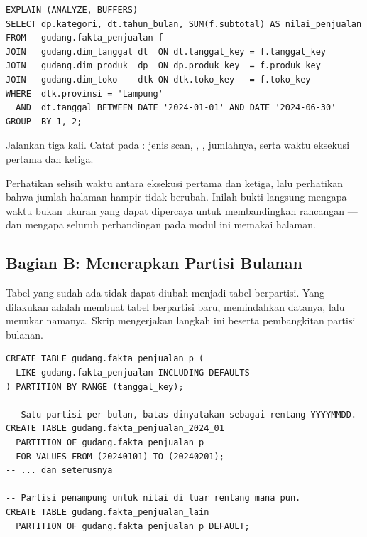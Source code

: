 
\begin{lstlisting}[style=sqlgaya]
EXPLAIN (ANALYZE, BUFFERS)
SELECT dp.kategori, dt.tahun_bulan, SUM(f.subtotal) AS nilai_penjualan
FROM   gudang.fakta_penjualan f
JOIN   gudang.dim_tanggal dt  ON dt.tanggal_key = f.tanggal_key
JOIN   gudang.dim_produk  dp  ON dp.produk_key  = f.produk_key
JOIN   gudang.dim_toko    dtk ON dtk.toko_key   = f.toko_key
WHERE  dtk.provinsi = 'Lampung'
  AND  dt.tanggal BETWEEN DATE '2024-01-01' AND DATE '2024-06-30'
GROUP  BY 1, 2;
\end{lstlisting}

Jalankan tiga kali. Catat pada : jenis scan,
, , jumlahnya, serta waktu eksekusi
pertama dan ketiga.

\begin{catatan}
Perhatikan selisih waktu antara eksekusi pertama dan ketiga, lalu perhatikan
bahwa jumlah halaman hampir tidak berubah. Inilah bukti langsung mengapa waktu
bukan ukuran yang dapat dipercaya untuk membandingkan rancangan --- dan
mengapa seluruh perbandingan pada modul ini memakai halaman.
\end{catatan}

\subsection{Bagian B: Menerapkan Partisi Bulanan}


Tabel yang sudah ada tidak dapat diubah menjadi tabel berpartisi. Yang
dilakukan adalah membuat tabel berpartisi baru, memindahkan datanya, lalu
menukar namanya. Skrip 
mengerjakan langkah ini beserta pembangkitan partisi bulanan.

\begin{lstlisting}[style=sqlgaya]
CREATE TABLE gudang.fakta_penjualan_p (
  LIKE gudang.fakta_penjualan INCLUDING DEFAULTS
) PARTITION BY RANGE (tanggal_key);

-- Satu partisi per bulan, batas dinyatakan sebagai rentang YYYYMMDD.
CREATE TABLE gudang.fakta_penjualan_2024_01
  PARTITION OF gudang.fakta_penjualan_p
  FOR VALUES FROM (20240101) TO (20240201);
-- ... dan seterusnya

-- Partisi penampung untuk nilai di luar rentang mana pun.
CREATE TABLE gudang.fakta_penjualan_lain
  PARTITION OF gudang.fakta_penjualan_p DEFAULT;
\end{lstlisting}

